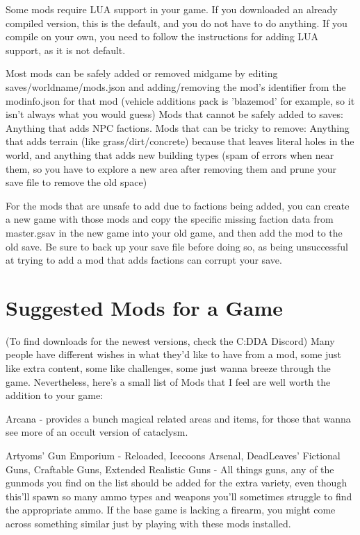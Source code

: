 \documentclass[11pt]{report}
\begin{document}
Some mods require LUA support in your game.  If you downloaded an already compiled version, this is the default, and you do not have to do anything.  If you compile on your own, you need to follow the instructions for adding LUA support, as it is not default.

Most mods can be safely added or removed midgame by editing saves/worldname/mods.json and adding/removing the mod's identifier from the modinfo.json for that mod (vehicle additions pack is 'blazemod' for example, so it isn't always what you would guess)  Mods that cannot be safely added to saves: Anything that adds NPC factions.  Mods that can be tricky to remove: Anything that adds terrain (like grass/dirt/concrete) because that leaves literal holes in the world, and anything that adds new building types (spam of errors when near them, so you have to explore a new area after removing them and prune your save file to remove the old space)

For the mods that are unsafe to add due to factions being added, you can create a new game with those mods and copy the specific missing faction data from master.gsav in the new game into your old game, and then add the mod to the old save.  Be sure to back up your save file before doing so, as being unsuccessful at trying to add a mod that adds factions can corrupt your save.

\section{Suggested Mods for a Game}

(To find downloads for the newest versions, check the C:DDA Discord)
Many people have different wishes in what they'd like to have from a mod, some just like extra content, some like challenges, some just wanna breeze through the game. Nevertheless, here's a small list of Mods that I feel are well worth the addition to your game:

Arcana - provides a bunch magical related areas and items, for those that wanna see more of an occult version of cataclysm.

Artyoms' Gun Emporium - Reloaded, Icecoons Arsenal, DeadLeaves' Fictional Guns, Craftable Guns, Extended Realistic Guns - All things guns, any of the gunmods you find on the list should be added for the extra variety, even though this'll spawn so many ammo types and weapons you'll sometimes struggle to find the appropriate ammo. If the base game is lacking a firearm, you might come across something similar just by playing with these mods installed.
\end{document}
